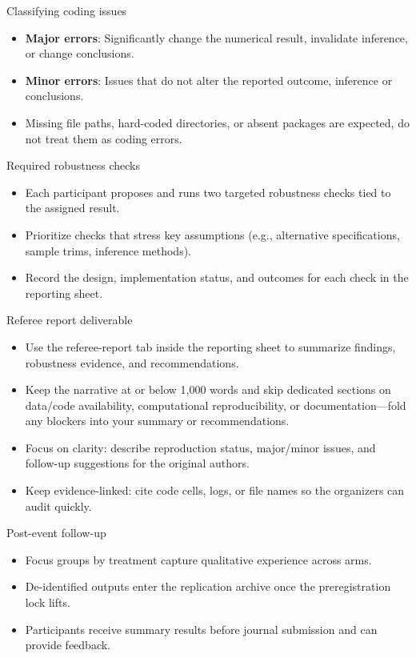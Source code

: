 \documentclass[aspectratio=169,professionalfonts]{beamer}
\begin{document}
\begin{frame}{Classifying coding issues}
  \begin{itemize}
    \item \textbf{Major errors}: Significantly change the numerical result, invalidate inference, or change conclusions.
    \item \textbf{Minor errors}: Issues that do not alter the reported outcome, inference or conclusions.
    \item Missing file paths, hard-coded directories, or absent packages are expected, do not treat them as coding errors.
  \end{itemize}
\end{frame}

\begin{frame}{Required robustness checks}
  \begin{itemize}
    \item Each participant proposes and runs two targeted robustness checks tied to the assigned result.
    \item Prioritize checks that stress key assumptions (e.g., alternative specifications, sample trims, inference methods).
    \item Record the design, implementation status, and outcomes for each check in the reporting sheet.
  \end{itemize}
\end{frame}

\begin{frame}{Referee report deliverable}
  \begin{itemize}
    \item Use the referee-report tab inside the reporting sheet to summarize findings, robustness evidence, and recommendations.
    \item Keep the narrative at or below 1,000 words and skip dedicated sections on data/code availability, computational reproducibility, or documentation—fold any blockers into your summary or recommendations.
    \item Focus on clarity: describe reproduction status, major/minor issues, and follow-up suggestions for the original authors.
    \item Keep evidence-linked: cite code cells, logs, or file names so the organizers can audit quickly.
  \end{itemize}
\end{frame}

\begin{frame}{Post-event follow-up}
  \begin{itemize}
    \item Focus groups by treatment capture qualitative experience across arms.
    \item De-identified outputs enter the replication archive once the preregistration lock lifts.
    \item Participants receive summary results before journal submission and can provide feedback.
  \end{itemize}
\end{frame}
\end{document}

